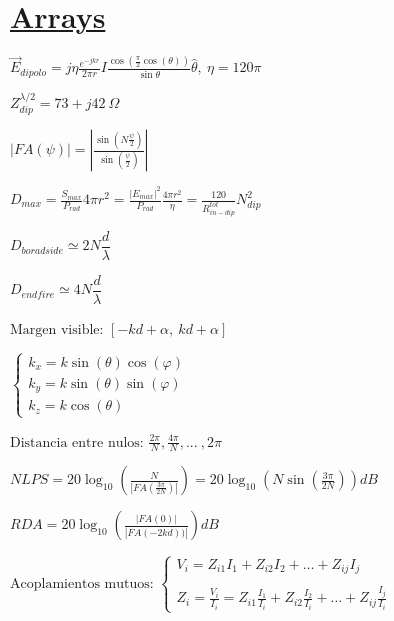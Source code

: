 \documentclass[twocolumn, 8pt]{extarticle}
\begin{document}
\section*{\underline{Arrays}}
\( \vec{E}_{dipolo} = j \eta \frac{ e^{-jkr} }{ 2 \pi r } I \frac{ \cos\left(\frac{\pi}{2} \cos(\theta)\right) }{\sin{\theta}} \hat{\theta} ,\ \eta = 120\pi \)

\vspace{0.5cm}
\( Z_{dip}^{\lambda / 2} = 73 + j42 \  \Omega \)

\vspace{0.5cm}
\( \left|FA(\psi)\right| = \left|\frac{ \sin(N \frac{\psi}{2}) }{ \sin(\frac{\psi}{2}) } \right|\)

\vspace{0.5cm}
\( D_{max} = \frac{ S_{max} }{ P_{rad}} 4\pi r^2  = \frac{ \left|E_{max}\right|^2 }{ P_{rad}} \frac{4\pi r^2}{\eta} = \frac{120}{R^{tot}_{in-dip}}N^2_{dip} \)

\vspace{0.5cm}
\( D_{boradside} \simeq  2N \dfrac{d}{\lambda}\)

\vspace{0.5cm}
\( D_{endfire} \simeq  4N \dfrac{d}{\lambda}\)

\vspace{0.5cm}
\( \text{Margen visible: } [-kd + \alpha,\ kd + \alpha] \)

\vspace{0.5cm}
\(\left \{
\begin{array}{l}
    k_x = k \sin(\theta) \cos(\varphi) \\
    k_y = k \sin(\theta) \sin(\varphi) \\
    k_z = k \cos(\theta)
\end{array}
\right .
\)

\vspace{0.5cm}
\( \text{Distancia entre nulos: } \frac{ 2\pi }{ N }, \frac{ 4\pi }{ N } , ... \ , 2\pi \)

\vspace{0.5cm}
\( NLPS = 20 \log_{10} \left(\frac{ N }{\left|FA\left(\frac{ 3\pi }{ 2N }\right)\right|} \right) = 20 \log_{10} \left(N \sin\left( \frac{ 3\pi }{ 2N }\right)\right) dB \)

\vspace{0.5cm}
\( RDA = 20 \log_{10} \left( \frac{ \left|FA(0)\right| }{ \left|FA(-2kd))\right| } \right) dB \)

\vspace{0.5cm}
\( \text{Acoplamientos mutuos: } \left \{
\begin{array}{l}
    V_i = Z_{i1}I_1 + Z_{i2}I_2 + \dots + Z_{ij}I_j \\ \\
    Z_i = \frac{V_i}{I_i} = Z_{i1} \frac{I_1}{I_i} + Z_{i2} \frac{I_2}{I_i} + \dots + Z_{ij} \frac{I_j}{I_i}
\end{array}
\right .
\)
\end{document}
